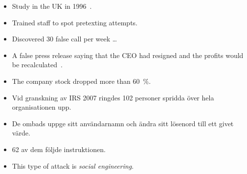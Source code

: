 \begin{frame}
  \begin{example}
    \begin{itemize}
      \item Study in the UK in 1996~\cite{Anderson2008sea}.
      \item Trained staff to spot pretexting attempts.
      \item Discovered 30 false call per week \dots
    \end{itemize}
  \end{example}
\end{frame}

\begin{frame}
  \begin{example}
    \begin{itemize}
      \item A false press release saying that the CEO had resigned and the 
        profits would be recalculated~\cite{Anderson2008sea}.
      \item The company stock dropped more than \SI{60}{\%}.
    \end{itemize}
  \end{example}
\end{frame}

\begin{frame}
  \begin{example}
    \begin{itemize}
      \item Vid granskning av IRS 2007 ringdes 102 personer spridda över hela 
        organisationen upp.

      \item De ombads uppge sitt användarnamn och ändra sitt lösenord till ett 
        givet värde.

      \item 62 av dem följde instruktionen.

    \end{itemize}
  \end{example}
\end{frame}

\begin{frame}
  \begin{remark}
    \begin{itemize}
      \item This type of attack is \emph{social engineering}.
    \end{itemize}
  \end{remark}
\end{frame}

